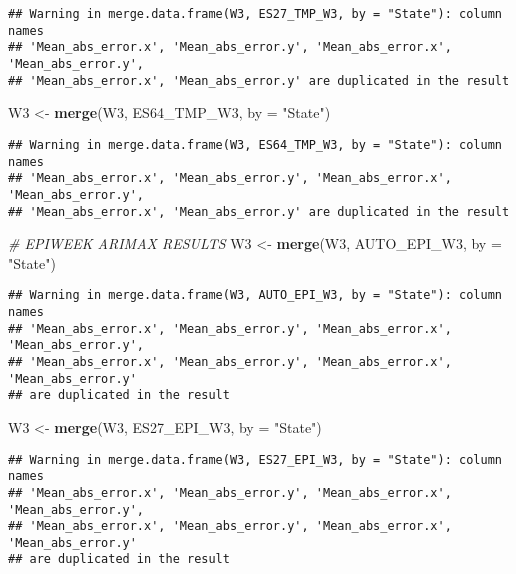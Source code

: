 \documentclass[
]{article}
\newenvironment{Shaded}{\begin{snugshade}}{\end{snugshade}}
\newcommand{\AttributeTok}[1]{\textcolor[rgb]{0.13,0.29,0.53}{#1}}
\newcommand{\CommentTok}[1]{\textcolor[rgb]{0.56,0.35,0.01}{\textit{#1}}}
\newcommand{\FunctionTok}[1]{\textcolor[rgb]{0.13,0.29,0.53}{\textbf{#1}}}
\newcommand{\NormalTok}[1]{#1}
\newcommand{\OtherTok}[1]{\textcolor[rgb]{0.56,0.35,0.01}{#1}}
\newcommand{\StringTok}[1]{\textcolor[rgb]{0.31,0.60,0.02}{#1}}
\begin{document}
\begin{verbatim}
## Warning in merge.data.frame(W3, ES27_TMP_W3, by = "State"): column names
## 'Mean_abs_error.x', 'Mean_abs_error.y', 'Mean_abs_error.x', 'Mean_abs_error.y',
## 'Mean_abs_error.x', 'Mean_abs_error.y' are duplicated in the result
\end{verbatim}

\begin{Shaded}
\begin{Highlighting}[]
\NormalTok{W3 }\OtherTok{\textless{}{-}} \FunctionTok{merge}\NormalTok{(W3, ES64\_TMP\_W3, }\AttributeTok{by =} \StringTok{"State"}\NormalTok{)}
\end{Highlighting}
\end{Shaded}

\begin{verbatim}
## Warning in merge.data.frame(W3, ES64_TMP_W3, by = "State"): column names
## 'Mean_abs_error.x', 'Mean_abs_error.y', 'Mean_abs_error.x', 'Mean_abs_error.y',
## 'Mean_abs_error.x', 'Mean_abs_error.y' are duplicated in the result
\end{verbatim}

\begin{Shaded}
\begin{Highlighting}[]
\CommentTok{\# EPIWEEK ARIMAX RESULTS}
\NormalTok{W3 }\OtherTok{\textless{}{-}} \FunctionTok{merge}\NormalTok{(W3, AUTO\_EPI\_W3, }\AttributeTok{by =} \StringTok{"State"}\NormalTok{)}
\end{Highlighting}
\end{Shaded}

\begin{verbatim}
## Warning in merge.data.frame(W3, AUTO_EPI_W3, by = "State"): column names
## 'Mean_abs_error.x', 'Mean_abs_error.y', 'Mean_abs_error.x', 'Mean_abs_error.y',
## 'Mean_abs_error.x', 'Mean_abs_error.y', 'Mean_abs_error.x', 'Mean_abs_error.y'
## are duplicated in the result
\end{verbatim}

\begin{Shaded}
\begin{Highlighting}[]
\NormalTok{W3 }\OtherTok{\textless{}{-}} \FunctionTok{merge}\NormalTok{(W3, ES27\_EPI\_W3, }\AttributeTok{by =} \StringTok{"State"}\NormalTok{)}
\end{Highlighting}
\end{Shaded}

\begin{verbatim}
## Warning in merge.data.frame(W3, ES27_EPI_W3, by = "State"): column names
## 'Mean_abs_error.x', 'Mean_abs_error.y', 'Mean_abs_error.x', 'Mean_abs_error.y',
## 'Mean_abs_error.x', 'Mean_abs_error.y', 'Mean_abs_error.x', 'Mean_abs_error.y'
## are duplicated in the result
\end{verbatim}
\end{document}
